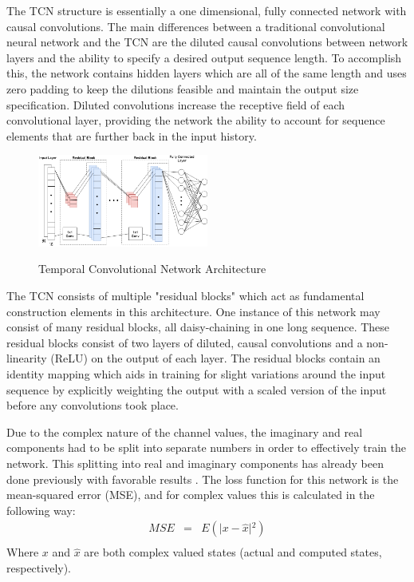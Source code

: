 \documentclass[twocolumn,letterpaper]{IEEEAerospaceCLS}  %
\begin{document}
The TCN structure is essentially a one dimensional, fully connected network with causal convolutions. The main differences between a traditional convolutional neural network and the TCN are the diluted causal convolutions between network layers and the ability to specify a desired output sequence length. To accomplish this, the network contains hidden layers which are all of the same length and uses zero padding to keep the dilutions feasible and maintain the output size specification. Diluted convolutions increase the receptive field of each convolutional layer, providing the network the ability to account for sequence elements that are further back in the input history. 

\begin{figure}[!h]
\centering\includegraphics[width=0.5\textwidth]{figs/TCN.png}\\
\caption{Temporal Convolutional Network Architecture}
\label{TCNstruct}
\end{figure}

The TCN consists of multiple "residual blocks" which act as fundamental construction elements in this architecture. One instance of this network may consist of many residual blocks, all daisy-chaining in one long sequence. These residual blocks consist of two layers of diluted, causal convolutions and a non-linearity (ReLU) on the output of each layer. The residual blocks contain an identity mapping which aids in training for slight variations around the input sequence by explicitly weighting the output with a scaled version of the input before any convolutions took place. 

Due to the complex nature of the channel values, the imaginary and real components had to be split into separate numbers in order to effectively train the network. This splitting into real and imaginary components has already been done previously with favorable results \cite{tacspinar2010back}.  The loss function for this network is the mean-squared error (MSE), and for complex values this is calculated in the following way:
\begin{eqnarray*}
MSE&=&E(\lvert {x-\hat{x}}\rvert{^2}) \\
\end{eqnarray*}
Where $x$ and $\hat{x}$ are both complex valued states (actual and computed states, respectively). 
\end{document}
